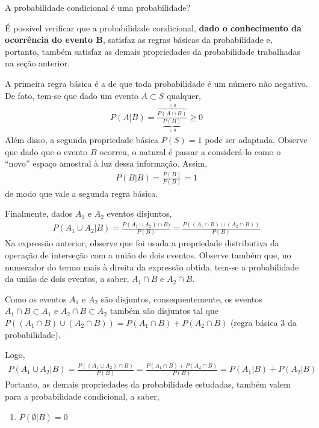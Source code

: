 \begin{example} {A probabilidade condicional é uma probabilidade?}

É possível verificar que a probabilidade condicional, \textbf{dado o conhecimento da ocorrência do evento B}, satisfaz as regras básicas da probabilidade e, portanto, também satisfaz as demais propriedades da probabilidade trabalhadas na seção anterior.

A primeira regra básica é a de que toda probabilidade é um número não negativo. De fato, tem-se que dado um evento \(A\subset S\) qualquer,
\begin{equation*}
\begin{split}P(A|B)=\frac{\overbrace{P(A\cap B)}^{\geq 0}}{\underbrace{P(B)}_{>0}}\geq 0\end{split}
\end{equation*}
Além disso, a segunda propriedade básica \(P(S)=1\) pode ser adaptada.  Observe que dado que o evento \(B\) ocorreu, o natural é passar a considerá-lo como o “novo” espaço amostral à luz dessa informação. Assim,
\begin{equation*}
\begin{split}P(B|B)=\frac{P(B)}{P(B)}=1\end{split}
\end{equation*}
de modo que vale a segunda regra básica.

Finalmente, dados \(A_1\) e \(A_2\)  eventos disjuntos,
\begin{equation*}
\begin{split}P(A_1\cup A_2|B)=\frac{P(A_1\cup A_2)\cap B)}{P(B)}=\frac{P((A_1\cap B)\cup(A_2\cap B))}{P(B)}\end{split}
\end{equation*}
Na expressão anterior, observe que foi usada a propriedade distributiva da operação de interseção com a união de dois eventos. Observe também que, no numerador do termo mais à direita da expressão obtida, tem-se a probabilidade da união de dois eventos, a saber, \(A_1\cap B\) e \(A_2\cap B\).

Como os eventos \(A_1\) e \(A_2\) são disjuntos, consequentemente, os eventos \(A_1\cap B\subset A_1\) e \(A_2\cap B\subset A_2\)  também são disjuntos tal que \(P((A_1\cap B)\cup(A_2\cap B))=P(A_1\cap B)+P(A_2\cap B)\) (regra básica 3 da probabilidade).

Logo,
\begin{equation*}
\begin{split}P(A_1\cup A_2|B)=\frac{P((A_1\cup A_2)\cap B)}{P(B)}=\frac{P(A_1\cap B)+P(A_2\cap B)}{P(B)}=P(A_1|B)+P(A_2|B)\end{split}
\end{equation*}
Portanto, as demais propriedades da probabilidade estudadas, também valem para a probabilidade condicional, a saber,
\begin{enumerate}
\item {} 
\(P(\emptyset |B)=0\)


\end{enumerate}
\end{example}
